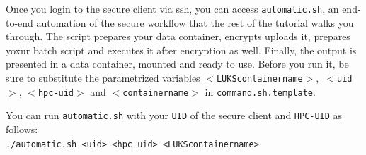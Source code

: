 \documentclass[paper=a4]{scrartcl}
\begin{document}
Once you login to the secure client via ssh, you can access \texttt{automatic.sh}, an end-to-end automation of the secure workflow that the rest of the tutorial walks you through. 
The script prepares your data container, encrypts uploads it, prepares yoxur batch script and executes it after encryption as well. Finally, the output is presented in a data container, mounted and ready to use. 
Before you run it, be sure to substitute the parametrized variables \texttt{$<$LUKScontainername$>$},\texttt{ $<$uid$>$}, \texttt{$<$hpc-uid$>$} and \texttt{$<$containername$>$} in \texttt{command.sh.template}. 

You can run \texttt{automatic.sh} with your \texttt{UID} of the secure client and \texttt{HPC-UID} as follows:\\
\texttt{./automatic.sh <uid> <hpc\_uid> <LUKScontainername>} \\
\end{document}
